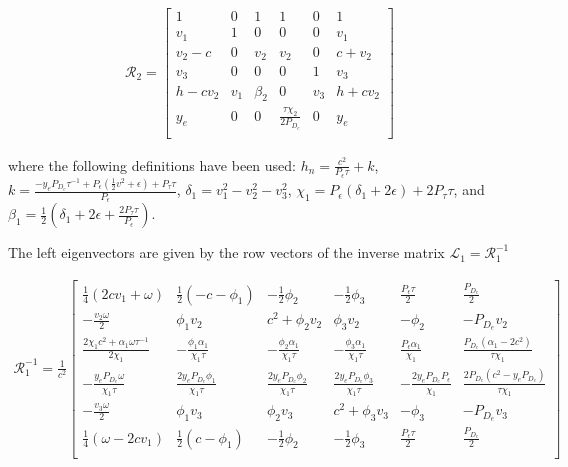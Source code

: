 \begin{align*}
  \mathcal{R}_{2} =
  \left[
  \begin{array}{cccccc}
    1 & 0 & 1 & 1 & 0 & 1 \\
    v_{1} & 1 & 0 & 0 & 0 & v_{1} \\
    v_{2}-c & 0 & v_{2} & v_{2} & 0 & c+v_{2} \\
    v_{3} & 0 & 0 & 0 & 1 & v_{3} \\
    h-c v_{2} & v_{1} & \beta_{2} & 0 & v_{3} & h+c v_{2} \\
    y_{e}  & 0 & 0 & \frac{\tau  \chi_{2} }{2 P_{D_{e}}} & 0 & y_{e}  \\
  \end{array}
  \right]
\end{align*}


where the following definitions have been used:
$h_{n} = \frac{c^2}{P_{\epsilon}\tau} + k $, $k = \frac{-y_{e} P_{D_{e}} \tau^{-1}
+ P_{\epsilon} (\frac{1}{2}v^2 + \epsilon) + P_{\tau}\tau}{P_{\epsilon}}$,
$\delta_{1} = v_{1}^{2}-v_{2}^{2}-v_{3}^{2}$,
$\chi_{1} = P_{\epsilon} ( \delta_{1} + 2\epsilon) + 2P_{\tau}\tau$, and
$\beta_{1} = \frac{1}{2} (\delta_{1}+2 \epsilon +\frac{2 P_{\tau} \tau }{P_{\epsilon}})$.



The left eigenvectors are given by the row vectors of the inverse matrix $\mathcal{L}_{1} = \mathcal{R}_{1}^{-1}$

\begin{align*}
  \mathcal{R}_{1}^{-1} = \frac{1}{c^2}
  \left[
  \begin{array}{cccccc}
   \frac{1}{4} (2 c  v_{1}+\omega ) & \frac{1}{2} (-c- \phi_{1} ) & -\frac{1}{2} \phi_{2}
    & -\frac{1}{2} \phi_{3}  & \frac{P_{\epsilon} \tau }{2} & \frac{P_{D_{e}}}{2}
     \\
   -\frac{v_{2} \omega }{2} & \phi_{1} v_{2}  & c^2+\phi_{2} v_{2}  &
     \phi_{3} v_{2}  & -\phi_{2}  & -P_{D_{e}} v_{2}
     \\
   \frac{2 \chi_{1}  c^2+\alpha_{1}  \omega \tau^{-1} }{2 \chi_{1} } & -\frac{\phi_{1} \alpha_{1}  }{\chi_{1} \tau } &
     -\frac{\phi_{2} \alpha_{1}  }{\chi_{1} \tau } & -\frac{\phi_{3} \alpha_{1} }{\chi_{1} \tau } &
     \frac{P_{\epsilon} \alpha_{1} }{\chi_{1} } & \frac{P_{D_{e}} \left(\alpha_{1} -2 c^2\right)}{\tau \chi_{1} }
      \\
   -\frac{y_{e} P_{D_{e}} \omega }{\chi_{1} \tau } & \frac{2 y_{e} P_{D_{e}} \phi_{1} }{\chi_{1} \tau } & \frac{2 y_{e} P_{D_{e}}
     \phi_{2} }{\chi_{1} \tau} & \frac{2 y_{e} P_{D_{e}} \phi_{3} }{\chi_{1} \tau} & -\frac{2 y_{e}
     P_{D_{e}} P_{\epsilon} }{\chi_{1} } & \frac{2 P_{D_{e}} \left(c^2-y_{e} P_{D_{e}} \right)}{\tau \chi_{1} }
      \\
   -\frac{v_{3} \omega }{2} & \phi_{1} v_{3}  & \phi_{2} v_{3}   &
     c^2+\phi_{3} v_{3}  & -\phi_{3}  & -P_{D_{e}} v_{3}
      \\
   \frac{1}{4} (\omega -2 c  v_{1}) & \frac{1}{2} (c-\phi_{1} ) & -\frac{1}{2} \phi_{2}
       & -\frac{1}{2} \phi_{3}  & \frac{P_{\epsilon} \tau }{2} & \frac{P_{D_{e}}}{2}
     \\
  \end{array}
  \right]
\end{align*}

